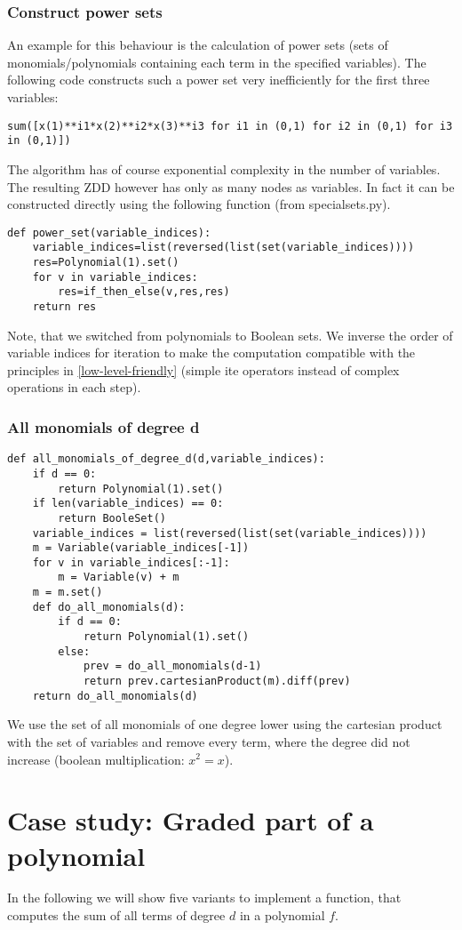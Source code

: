 \documentclass[]{article}
\newcommand{\ite}{{ite}\xspace}
\begin{document}
\subsubsection{Construct power sets}
An example for this behaviour is the calculation of power sets (sets of monomials/polynomials containing each term in the specified variables).
The following code constructs such a power set very inefficiently for the first three variables:
\begin{verbatim}
sum([x(1)**i1*x(2)**i2*x(3)**i3 for i1 in (0,1) for i2 in (0,1) for i3 in (0,1)])
\end{verbatim}
The algorithm has of course exponential complexity in the number of variables.
The resulting ZDD however has only as many nodes as variables.
In fact it can be constructed directly using the following function (from specialsets.py).
\begin{verbatim}
def power_set(variable_indices):
    variable_indices=list(reversed(list(set(variable_indices))))
    res=Polynomial(1).set()
    for v in variable_indices:
        res=if_then_else(v,res,res)
    return res
\end{verbatim}
Note, that we switched from polynomials to Boolean sets. We inverse the order of variable indices for iteration to make the computation compatible with the principles in \ref{low-level-friendly} (simple \ite operators instead of complex operations in each step).
\subsubsection{All monomials of degree d}
\begin{verbatim}
def all_monomials_of_degree_d(d,variable_indices):
    if d == 0:
        return Polynomial(1).set()
    if len(variable_indices) == 0:
        return BooleSet()
    variable_indices = list(reversed(list(set(variable_indices))))
    m = Variable(variable_indices[-1])
    for v in variable_indices[:-1]:
        m = Variable(v) + m
    m = m.set()
    def do_all_monomials(d):
        if d == 0:
            return Polynomial(1).set()
        else:
            prev = do_all_monomials(d-1)
            return prev.cartesianProduct(m).diff(prev)
    return do_all_monomials(d)
\end{verbatim}
We use the set of all monomials of one degree lower using the cartesian product with the set of variables and remove every term, where the degree did not increase (boolean multiplication: $x^2=x$).

\section{Case study: Graded part of a polynomial}
In the following we will show five variants to implement a function, that computes the sum of all terms of degree $d$ in a polynomial $f$.
\end{document}
